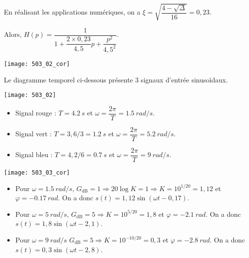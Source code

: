  En réalisant les applications numériques, on a $\xi = \sqrt{\dfrac{4-\sqrt{\Delta}}{16}} = 0,23$.
  
Alors, $H(p)=\dfrac{1}{1+\dfrac{2\times 0,23}{4,5}p+\dfrac{p^2}{4,5^2}}$.
\begin{center}
\texttt{[image: 503\_02\_cor]}
\end{center}
\else

Le diagramme temporel ci-dessous présente 3 signaux d'entrée sinusoïdaux.
\begin{center}
\texttt{[image: 503\_02]}
\end{center}

\fi

\ifprof
\begin{itemize}
\item Signal rouge : $T=\SI{4,2}{s}$ et $\omega= \dfrac{2\pi}{T} = \SI{1,5}{rad/s}$.
\item Signal vert : $T=3,6/3 = \SI{1,2}{s}$ et $\omega= \dfrac{2\pi}{T} = \SI{5,2}{rad/s}$.
\item Signal bleu : $T=4,2/6 = \SI{0,7}{s}$  et $\omega= \dfrac{2\pi}{T} = \SI{9}{rad/s}$.
\end{itemize}
\else
\fi


\ifprof
\begin{center}
\texttt{[image: 503\_03\_cor]}
\end{center}

\begin{itemize}
\item Pour  $\omega = \SI{1,5}{rad/s}$, $G_{\text{dB}}=1 \Rightarrow 20\log K = 1 \Rightarrow  K = 10^{1/20} = 1,12$ et $\varphi =  -\SI{0,17}{rad}$. On a donc $s(t)=1,12\sin\left(\omega t - 0,17\right)$.
\item Pour  $\omega = \SI{5}{rad/s}$, $G_{\text{dB}}=5 \Rightarrow  K = 10^{5/20} = 1,8$ et $\varphi =  -\SI{2,1}{rad}$. On a donc $s(t)=1,8\sin\left(\omega t - 2,1\right)$.
\item Pour  $\omega = \SI{9}{rad/s}$ $G_{\text{dB}}=5 \Rightarrow  K = 10^{-10/20} = 0,3$ et 
$\varphi =  -\SI{2,8}{rad}$. On a donc $s(t)=0,3\sin\left(\omega t - 2,8\right)$.
\end{itemize}
\else
\fi





